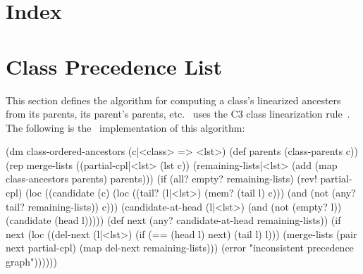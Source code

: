 \documentclass[twoside,twocolumn,9pt]{extarticle}
\begin{document}
% 
% 
% 
% 

\W\section*{Index}
\W\htmlprintindex




\texonly{
\appendix
}

\section{Class Precedence List}
\label{cpl}

This section defines the algorithm for computing a class's linearized
ancesters from its parents, its parent's parents, etc.  \goo\ uses
the C3 class linearization rule~\cite{dylan-cpl}.  The following is
the \goo\ implementation of this algorithm:

\begin{exv}
(dm class-ordered-ancestors (c|<class> => <lst>)
  (def parents (class-parents c))
  (rep merge-lists
      ((partial-cpl|<lst>     
         (lst c)) 
       (remaining-lists|<lst> 
         (add (map class-ancestors parents) parents)))
    (if (all? empty? remaining-lists)
        (rev! partial-cpl)
        (loc ((candidate (c) 
                (loc ((tail? (l|<lst>) (mem? (tail l) c)))
                  (and (not (any? tail? remaining-lists)) c)))
              (candidate-at-head (l|<lst>)
                (and (not (empty? l)) (candidate (head l)))))
          (def next (any? candidate-at-head remaining-lists))
          (if next
              (loc ((del-next (l|<lst>)
                      (if (== (head l) next) (tail l) l)))
                (merge-lists
                 (pair next partial-cpl) 
                 (map del-next remaining-lists)))
              (error "inconsistent precedence graph"))))))
\end{exv}
\end{document}
